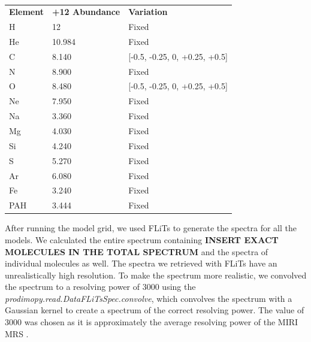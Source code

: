 \documentclass[twoside, single, authoryear, semicolon]{lion-msc}
\newcommand{\3}{$_3$}
\newcommand{\2}{$_2$}
\begin{document}
\begin{table}[!h]
\centering
\begin{tabular}{@{}lll@{}}
                                  &                             &                            \\ \hline\midrule
\textbf{Element} & \textbf{+12 Abundance} & \textbf{Variation}            \\ \midrule
H                & 12                     & Fixed                         \\
He               & 10.984                 & Fixed                         \\
C                & 8.140                  & {[}-0.5, -0.25, 0, +0.25, +0.5{]} \\
N                & 8.900                  & Fixed                         \\
O                & 8.480                  & {[}-0.5, -0.25, 0, +0.25, +0.5{]} \\
Ne               & 7.950                  & Fixed                         \\
Na               & 3.360                  & Fixed                         \\
Mg               & 4.030                  & Fixed                         \\
Si               & 4.240                  & Fixed                         \\
S                & 5.270                  & Fixed                         \\
Ar               & 6.080                  & Fixed                         \\
Fe               & 3.240                  & Fixed                         \\
PAH              & 3.444                  & Fixed                         \\ \bottomrule
\end{tabular}
\caption{}
\label{tab:abundances}
\end{table}



After running the model grid, we used FLiTs to generate the spectra for all the models. We calculated the entire spectrum containing  \textbf{INSERT EXACT MOLECULES IN THE TOTAL SPECTRUM} and the spectra of individual molecules as well. The spectra we retrieved with FLiTs have an unrealistically high resolution. To make the spectrum more realistic, we convolved the spectrum to a resolving power of 3000 using the \textit{prodimopy.read.DataFLiTsSpec.convolve}\citep{SOURCE}, which convolves the spectrum with a Gaussian kernel to create a spectrum of the correct resolving power. The value of 3000 was chosen as it is approximately the average resolving power of the MIRI MRS \citep{SOURCE}. 
\end{document}
